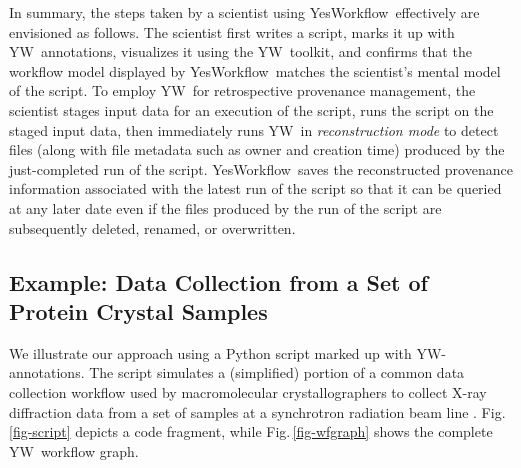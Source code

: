 \documentclass[nocopyrightspace]{sigplanconf}
\newcommand{\figref}[1]{Fig.\,\ref{#1}}
\newcommand{\YW}{\textsf{YesWorkflow}}
\newcommand{\yw}{\textsf{YW}}
\begin{document}
In summary, the steps taken by a scientist using \YW\ effectively are
envisioned as follows.  The scientist first writes a script, marks it
up with \yw\ annotations, visualizes it using the \yw\ toolkit, and
confirms that the workflow model displayed by \YW\ matches the
scientist's mental model of the script.  To employ \yw\ for
retrospective provenance management, the scientist stages input data
for an execution of the script, runs the script on the staged input
data, then immediately runs \yw\ in \emph{reconstruction mode} to
detect files (along with file metadata such as owner and creation
time) produced by the just-completed run of the script. \YW\ saves the
reconstructed provenance information associated with the latest run of
the script so that it can be queried at any later date even if the
files produced by the run of the script are subsequently deleted,
renamed, or overwritten.




\subsection{Example: Data Collection from a Set of Protein Crystal
  Samples}
We illustrate our approach using a Python script marked up with
\yw-annotations.  The script simulates a (simplified) portion of 
a common data collection workflow used by macromolecular crystallographers to
collect X-ray diffraction data from a set of samples at a synchrotron
radiation beam line \protect\cite{tsai2013autodrug}.
\figref{fig-script} depicts a code fragment, while
\figref{fig-wfgraph} shows the complete \yw\ workflow graph.
\end{document}
